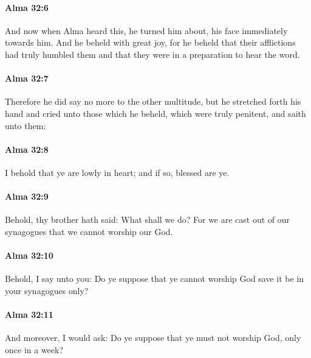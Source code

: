 		\paragraph{Alma 32:6} %
			\label{ALMA-32-6}

			And now when Alma heard this,
			he turned him about, his face immediately towards him.
			And he beheld with great joy,
			for he beheld that their afflictions had truly humbled them
			and that they were in a preparation to hear the word.

		\paragraph{Alma 32:7} %
			\label{ALMA-32-7}

			Therefore he did say no more to the other multitude,
			but he stretched forth his hand
			and cried unto those which he beheld, which were truly penitent,
			and saith unto them:

		\paragraph{Alma 32:8} %
			\label{ALMA-32-8}

			I behold that ye are lowly in heart;
			and if so, blessed are ye.

		\paragraph{Alma 32:9} %
			\label{ALMA-32-9}

			Behold, thy brother hath said:
			What shall we do?
			For we are cast out of our synagogues that we cannot worship our God.

		\paragraph{Alma 32:10} %
			\label{ALMA-32-10}

			Behold, I say unto you:
			Do ye suppose that ye cannot worship God save it be in your synagogues only?

		\paragraph{Alma 32:11} %
			\label{ALMA-32-11}

			And moreover, I would ask:
			Do ye suppose that ye must not worship God, only once in a week?

